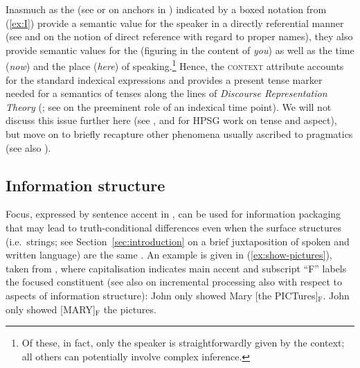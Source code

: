 \documentclass[output=paper
	        ,collection
	        ,collectionchapter
 	        ,biblatex
                ,babelshorthands
                ,newtxmath
                ,draftmode
                ,colorlinks, citecolor=brown
]{langscibook}
\begin{document}
Inasmuch as the   (see \citealt[--73]{Barwise:Perry:1983} or \citealt[--63]{Devlin:1991} on anchors in ) indicated by a boxed notation from (\ref{ex:I}) provide a semantic value for the speaker in a directly referential  manner (see \citealt{Marcus:1961} and \citealt{Kripke:1980} on the notion of direct reference with regard to  proper names), they also provide semantic values for the  (figuring in the content of \textit{you}) as well as the time (\textit{now}) and the place (\textit{here}) of speaking.\footnote{Of these, in fact, only the speaker is straightforwardly given by the context; all others can potentially involve complex inference.}
%
Hence, the \textsc{context} attribute accounts for the standard indexical expressions and provides a present tense marker needed for a semantics of tenses  along the lines of \emph{Discourse Representation Theory}  (\citealt{Kamp:Reyle:1993}; see \citealt{partee1973some} on the preeminent role of an indexical time point).
%
We will not discuss this issue further here (see \citealt{Van-Eynde:1998,Van-Eynde:2000}, \citealt{Bonami:2002} and \citealt{Costa:Branco:2012} for HPSG work on tense and aspect), but move on to briefly recapture other phenomena usually ascribed to pragmatics (see also \citealt[Section 5.2]{Kathol:Przepiorkowski:Tseng:2011}).
 




  
\subsection{Information structure}
\label{sec:information-structure}

Focus, expressed by sentence accent in , can be used for information packaging that may lead to truth-conditional differences  even when the surface structures (i.e.\ strings; see Section~\ref{sec:introduction} on a brief juxtaposition of spoken and written language) are the same \citep{Halliday:1967}.
%
An example is given in (\ref{ex:show-pictures}), taken from \citet[]{Krifka:2008}, where capitalisation indicates main accent and subscript \enquote{F} labels the focused constituent (see also  on incremental processing also with respect to aspects of information structure):
%
\ea \label{ex:show-pictures}
  \ea John only showed Mary [the PICTures]$_\text{F}$.
  \ex John only showed [MARY]$_\text{F}$ the pictures.
  \z
\z
\end{document}
